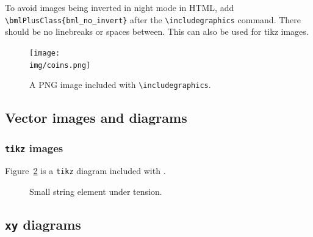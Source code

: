 To avoid images being inverted in night mode in HTML, add \verb|\bmlPlusClass{bml_no_invert}| after the \verb|\includegraphics| command. There should be no linebreaks or spaces between. This can also be used for tikz images.

\begin{figure}[H]
    \centering
    \texttt{[image: \\img/coins.png]}
    \caption{A PNG image included with \texttt{\textbackslash includegraphics}.}
    \label{fig:coins}
\end{figure}


\subsection{Vector images and diagrams}

\subsubsection{\texttt{tikz} images}
\label{demo:fig:tikz}

Figure~\ref{fig:string} is a \texttt{tikz} diagram included with \verb||.

\begin{figure}[H]
    \centering
    
    \caption{Small string element under tension.}
    \label{fig:string}
\end{figure}


\subsection{\texttt{xy} diagrams}
\label{demo:fig:xy}


